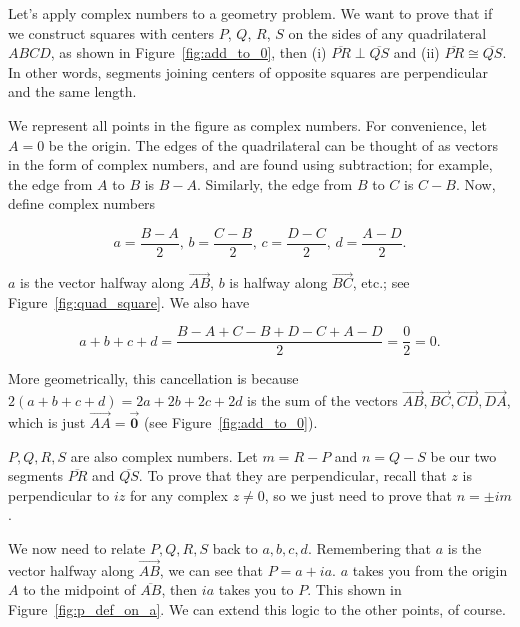 \documentclass[../textbook.tex]{subfiles}
\begin{document}
\noindent Let’s apply complex numbers to a geometry problem. We want to prove that if we construct squares with centers $P$, $Q$, $R$, $S$ on the sides of any quadrilateral $ABCD$, as shown in Figure~\ref{fig:add_to_0}, then (i) $\overline{PR} \perp \overline{QS}$ and (ii) $\overline{PR} \cong \overline{QS}$. In other words, segments joining centers of opposite squares are perpendicular and the same length.

We represent all points in the figure as complex numbers. For convenience, let $A=0$ be the origin. The edges of the quadrilateral can be thought of as vectors in the form of complex numbers, and are found using subtraction; for example, the edge from $A$ to $B$ is $B-A$. Similarly, the edge from $B$ to $C$ is $C-B$. Now, define complex numbers

$$a=\frac{B-A}{2},\, b=\frac{C-B}{2},\, c = \frac{D-C}{2},\, d = \frac{A-D}{2}.$$

\noindent$a$ is the vector halfway along $\overrightarrow{AB}$, $b$ is halfway along $\overrightarrow{BC}$, etc.; see Figure~\ref{fig:quad_square}. We also have

$$a+b+c+d=\frac{B-A+C-B+D-C+A-D}{2}=\frac{0}{2}=0.$$

\noindent More geometrically, this cancellation is because $2(a+b+c+d)=2a+2b+2c+2d$ is the sum of the vectors $\overrightarrow{AB}, \overrightarrow{BC}, \overrightarrow{CD}, \overrightarrow{DA}$, which is just $\overrightarrow{AA}=\overrightarrow{\mathbf{0}}$ (see Figure~\ref{fig:add_to_0}).

$P,Q,R,S$ are also complex numbers. Let $m=R-P$ and $n = Q-S$ be our two segments $\overline{PR}$ and $\overline{QS}$. To prove that they are perpendicular, recall that $z$ is perpendicular to $iz$ for any complex $z\neq 0$, so we just need to prove that $n=\pm im$.

We now need to relate $P,Q,R,S$ back to $a,b,c,d$. Remembering that $a$ is the vector halfway along $\overrightarrow{AB}$, we can see that $P = a+ia$. $a$ takes you from the origin $A$ to the midpoint of $\overline{AB}$, then $ia$ takes you to $P$. This shown in Figure~\ref{fig:p_def_on_a}. We can extend this logic to the other points, of course.
\end{document}
